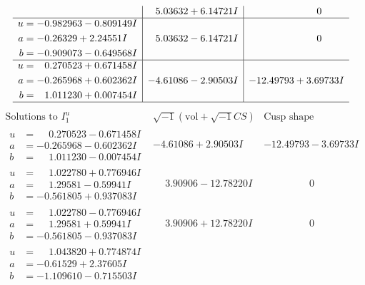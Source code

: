 \documentclass[1p]{elsarticle_modified}
\theoremstyle{definition}
\newcommand{\I}{\sqrt{-1}}
\begin{document}
$$\begin{array}{c|c|c}
 & \phantom{-}5.03632 + 6.14721 I & \phantom{-0.000000 } 0 \\ \hline\begin{aligned}
u &= -0.982963 - 0.809149 I \\
a &= -0.26329 + 2.24551 I \\
b &= -0.909073 - 0.649568 I\end{aligned}
 & \phantom{-}5.03632 - 6.14721 I & \phantom{-0.000000 } 0 \\ \hline\begin{aligned}
u &= \phantom{-}0.270523 + 0.671458 I \\
a &= -0.265968 + 0.602362 I \\
b &= \phantom{-}1.011230 + 0.007454 I\end{aligned}
 & -4.61086 - 2.90503 I & -12.49793 + 3.69733 I\\
 \hline 
 \end{array}$$\newpage$$\begin{array}{c|c|c}  
\text{Solutions to }I^u_{1}& \I (\text{vol} + \sqrt{-1}CS) & \text{Cusp shape}\\
 \hline 
\begin{aligned}
u &= \phantom{-}0.270523 - 0.671458 I \\
a &= -0.265968 - 0.602362 I \\
b &= \phantom{-}1.011230 - 0.007454 I\end{aligned}
 & -4.61086 + 2.90503 I & -12.49793 - 3.69733 I \\ \hline\begin{aligned}
u &= \phantom{-}1.022780 + 0.776946 I \\
a &= \phantom{-}1.29581 - 0.59941 I \\
b &= -0.561805 + 0.937083 I\end{aligned}
 & \phantom{-}3.90906 - 12.78220 I & \phantom{-0.000000 } 0 \\ \hline\begin{aligned}
u &= \phantom{-}1.022780 - 0.776946 I \\
a &= \phantom{-}1.29581 + 0.59941 I \\
b &= -0.561805 - 0.937083 I\end{aligned}
 & \phantom{-}3.90906 + 12.78220 I & \phantom{-0.000000 } 0 \\ \hline\begin{aligned}
u &= \phantom{-}1.043820 + 0.774874 I \\
a &= -0.61529 + 2.37605 I \\
b &= -1.109610 - 0.715503 I\end{aligned}

\end{array}$$
\end{document}
